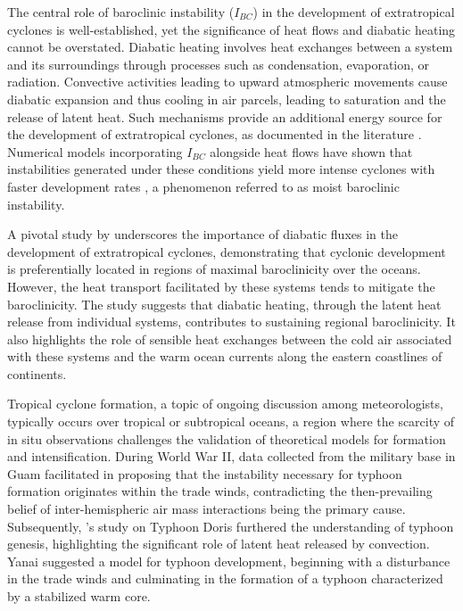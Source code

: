 The central role of baroclinic instability (\(I_{BC}\)) in the development of extratropical cyclones is well-established, yet the significance of heat flows and diabatic heating cannot be overstated. Diabatic heating involves heat exchanges between a system and its surroundings through processes such as condensation, evaporation, or radiation. Convective activities leading to upward atmospheric movements cause diabatic expansion and thus cooling in air parcels, leading to saturation and the release of latent heat. Such mechanisms provide an additional energy source for the development of extratropical cyclones, as documented in the literature \citep[e.g.]{chang2002storm}. Numerical models incorporating \(I_{BC}\) alongside heat flows have shown that instabilities generated under these conditions yield more intense cyclones with faster development rates \citep{gall1976effects,whitaker1994cyclogenesis,gutowski1992life}, a phenomenon referred to as moist baroclinic instability.

A pivotal study by \citet{hoskins1990existence} underscores the importance of diabatic fluxes in the development of extratropical cyclones, demonstrating that cyclonic development is preferentially located in regions of maximal baroclinicity over the oceans. However, the heat transport facilitated by these systems tends to mitigate the baroclinicity. The study suggests that diabatic heating, through the latent heat release from individual systems, contributes to sustaining regional baroclinicity. It also highlights the role of sensible heat exchanges between the cold air associated with these systems and the warm ocean currents along the eastern coastlines of continents.

Tropical cyclone formation, a topic of ongoing discussion among meteorologists, typically occurs over tropical or subtropical oceans, a region where the scarcity of in situ observations challenges the validation of theoretical models for formation and intensification. During World War II, data collected from the military base in Guam facilitated \citet{riehl1948formation} in proposing that the instability necessary for typhoon formation originates within the trade winds, contradicting the then-prevailing belief of inter-hemispheric air mass interactions being the primary cause. Subsequently, \citet{yanai1961detailed}'s study on Typhoon Doris furthered the understanding of typhoon genesis, highlighting the significant role of latent heat released by convection. Yanai suggested a model for typhoon development, beginning with a disturbance in the trade winds and culminating in the formation of a typhoon characterized by a stabilized warm core.

